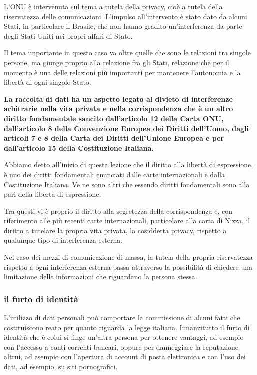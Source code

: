 L'ONU è intervenuta sul tema a tutela della privacy, cioè a tutela della riservatezza delle comunicazioni. L'impulso all'intervento è stato dato da alcuni Stati, in particolare il Brasile, che non hanno gradito un'interferenza da parte degli Stati Uniti nei propri affari di Stato.

Il tema importante in questo caso va oltre quelle che sono le relazioni tra singole persone, ma giunge proprio alla relazione fra gli Stati, relazione che per il momento è una delle relazioni più importanti per mantenere l'autonomia e la libertà di ogni singolo Stato.

\textbf{La raccolta di dati ha un aspetto legato al divieto di interferenze arbitrarie nella vita privata e nella corrispondenza che è un altro diritto fondamentale sancito dall'articolo 12 della Carta ONU, dall'articolo 8 della Convenzione Europea dei Diritti dell'Uomo, dagli articoli 7 e 8 della Carta dei Diritti dell'Unione Europea e per dall'articolo 15 della Costituzione Italiana.}

Abbiamo detto all'inizio di questa lezione che il diritto alla libertà di espressione, è uno dei diritti fondamentali enunciati dalle carte internazionali e dalla Costituzione Italiana. Ve ne sono altri che essendo diritti fondamentali sono alla pari della libertà di espressione. 

Tra questi vi è proprio il diritto alla segretezza della corrispondenza e, con riferimento alle più recenti carte internazionali, particolare alla carta di Nizza, il diritto a tutelare la propria vita privata, la cosiddetta privacy, rispetto a qualunque tipo di interferenza esterna.

Nel caso dei mezzi di comunicazione di massa, la tutela della propria riservatezza rispetto a ogni interferenza esterna passa attraverso la possibilità di chiedere una limitazione delle informazioni che riguardano la persona stessa.

\subsubsection{il furto di identità}

L'utilizzo di dati personali può comportare la commissione di alcuni fatti che costituiscono reato per quanto riguarda la legge italiana. Innanzitutto il furto di identità che è colui si finge un'altra persona per ottenere vantaggi, ad esempio con l'accesso a conti correnti bancari, oppure per danneggiare la reputazione altrui, ad esempio con l'apertura di account di posta elettronica e con l'uso dei dati, ad esempio, su siti pornografici.

